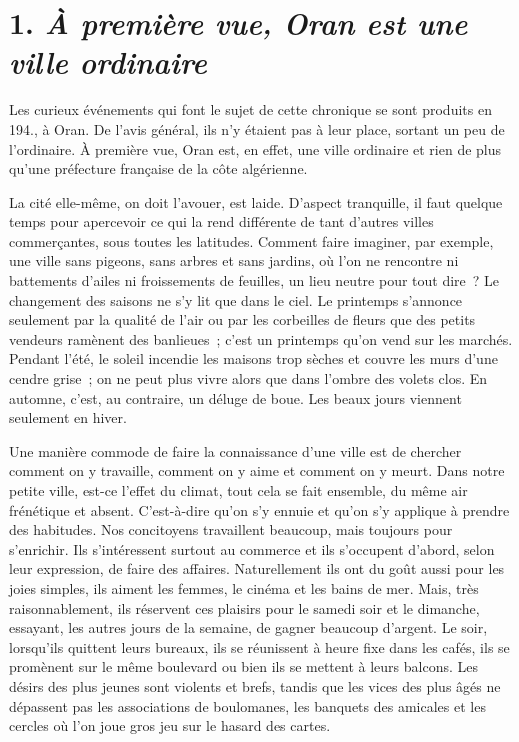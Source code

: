 \documentclass[french,twoside]{book} %
\begin{document}
\section[{1. À première vue, Oran est une ville ordinaire}]{1. \emph{À première vue, Oran est une ville ordinaire}}
\noindent Les curieux événements qui font le sujet de cette chronique se sont produits en 194., à Oran. De l’avis général, ils n’y étaient pas à leur place, sortant un peu de l’ordinaire. À première vue, Oran est, en effet, une ville ordinaire et rien de plus qu’une préfecture française de la côte algérienne.\par
La cité elle-même, on doit l’avouer, est laide. D’aspect tranquille, il faut quelque temps pour apercevoir ce qui la rend différente de tant d’autres villes commerçantes, sous toutes les latitudes. Comment faire imaginer, par exemple, une ville sans pigeons, sans arbres et sans jardins, où l’on ne rencontre ni battements d’ailes ni froissements de feuilles, un lieu neutre pour tout dire ? Le changement des saisons ne s’y lit que dans le ciel. Le printemps s’annonce seulement par la qualité de l’air ou par les corbeilles de fleurs que des petits vendeurs ramènent des banlieues ; c’est un printemps qu’on vend sur les marchés. Pendant l’été, le soleil incendie les maisons trop sèches et couvre les murs d’une cendre grise ; on ne peut plus vivre alors que dans l’ombre des volets clos. En automne, c’est, au contraire, un déluge de boue. Les beaux jours viennent seulement en hiver.\par
Une manière commode de faire la connaissance d’une ville est de chercher comment on y travaille, comment on y aime et comment on y meurt. Dans notre petite ville, est-ce l’effet du climat, tout cela se fait ensemble, du même air frénétique et absent. C’est-à-dire qu’on s’y ennuie et qu’on s’y applique à prendre des habitudes. Nos concitoyens travaillent beaucoup, mais toujours pour s’enrichir. Ils s’intéressent surtout au commerce et ils s’occupent d’abord, selon leur expression, de faire des affaires. Naturellement ils ont du goût aussi pour les joies simples, ils aiment les femmes, le cinéma et les bains de mer. Mais, très raisonnablement, ils réservent ces plaisirs pour le samedi soir et le dimanche, essayant, les autres jours de la semaine, de gagner beaucoup d’argent. Le soir, lorsqu’ils quittent leurs bureaux, ils se réunissent à heure fixe dans les cafés, ils se promènent sur le même boulevard ou bien ils se mettent à leurs balcons. Les désirs des plus jeunes sont violents et brefs, tandis que les vices des plus âgés ne dépassent pas les associations de boulomanes, les banquets des amicales et les cercles où l’on joue gros jeu sur le hasard des cartes.\par
\end{document}

